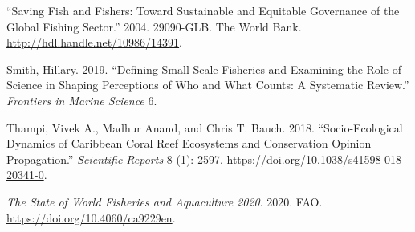 \documentclass[
]{article}
\newlength{\cslhangindent}
\newlength{\cslentryspacingunit} %
\newenvironment{CSLReferences}[2] %
 {%
  \setlength{\parindent}{0pt}
  \ifodd #1
  \let\oldpar\par
  \def\par{\hangindent=\cslhangindent\oldpar}
  \fi
  \setlength{\parskip}{#2\cslentryspacingunit}
 }%
 {}
\begin{document}
\begin{CSLReferences}{1}{0}
\leavevmode{}%
{``Saving {Fish} and {Fishers}: {Toward} {Sustainable} and {Equitable} {Governance} of the {Global} {Fishing} {Sector}.''} 2004. 29090-GLB. The World Bank. \url{http://hdl.handle.net/10986/14391}.

\leavevmode{}%
Smith, Hillary. 2019. {``Defining {Small}-{Scale} {Fisheries} and {Examining} the {Role} of {Science} in {Shaping} {Perceptions} of {Who} and {What} {Counts}: {A} {Systematic} {Review}.''} \emph{Frontiers in Marine Science} 6.

\leavevmode{}%
Thampi, Vivek A., Madhur Anand, and Chris T. Bauch. 2018. {``Socio-Ecological Dynamics of {Caribbean} Coral Reef Ecosystems and Conservation Opinion Propagation.''} \emph{Scientific Reports} 8 (1): 2597. \url{https://doi.org/10.1038/s41598-018-20341-0}.

\leavevmode{}%
\emph{The {State} of {World} {Fisheries} and {Aquaculture} 2020}. 2020. FAO. \url{https://doi.org/10.4060/ca9229en}.

\end{CSLReferences}
\end{document}
